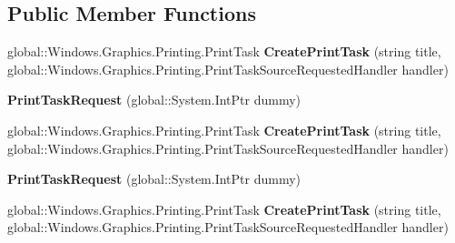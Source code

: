 \subsection*{Public Member Functions}
\begin{DoxyCompactItemize}
\item 
\mbox{\label{class_windows_1_1_graphics_1_1_printing_1_1_print_task_request_a81fceb9d986e446a9aadd169a220fa95}} 
global\+::\+Windows.\+Graphics.\+Printing.\+Print\+Task {\bfseries Create\+Print\+Task} (string title, global\+::\+Windows.\+Graphics.\+Printing.\+Print\+Task\+Source\+Requested\+Handler handler)
\item 
\mbox{\label{class_windows_1_1_graphics_1_1_printing_1_1_print_task_request_a57c37fd70c3014c3d9872b3d8a76aa6d}} 
{\bfseries Print\+Task\+Request} (global\+::\+System.\+Int\+Ptr dummy)
\item 
\mbox{\label{class_windows_1_1_graphics_1_1_printing_1_1_print_task_request_a81fceb9d986e446a9aadd169a220fa95}} 
global\+::\+Windows.\+Graphics.\+Printing.\+Print\+Task {\bfseries Create\+Print\+Task} (string title, global\+::\+Windows.\+Graphics.\+Printing.\+Print\+Task\+Source\+Requested\+Handler handler)
\item 
\mbox{\label{class_windows_1_1_graphics_1_1_printing_1_1_print_task_request_a57c37fd70c3014c3d9872b3d8a76aa6d}} 
{\bfseries Print\+Task\+Request} (global\+::\+System.\+Int\+Ptr dummy)
\item 
\mbox{\label{class_windows_1_1_graphics_1_1_printing_1_1_print_task_request_a81fceb9d986e446a9aadd169a220fa95}} 
global\+::\+Windows.\+Graphics.\+Printing.\+Print\+Task {\bfseries Create\+Print\+Task} (string title, global\+::\+Windows.\+Graphics.\+Printing.\+Print\+Task\+Source\+Requested\+Handler handler)
\item 
\mbox{\label{class_windows_1_1_graphics_1_1_printing_1_1_print_task_request_a57c37fd70c3014c3d9872b3d8a76aa6d}} 

\end{DoxyCompactItemize}
